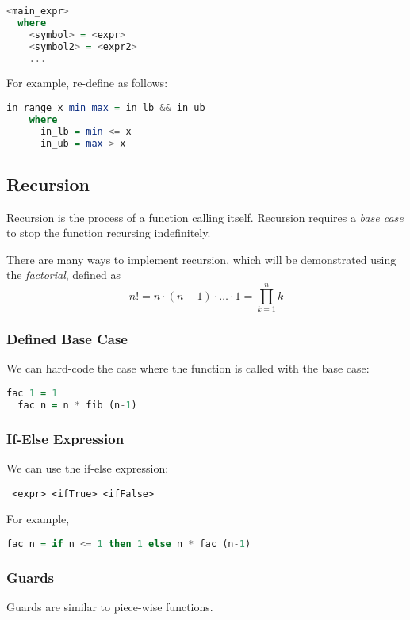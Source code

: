 \begin{lstlisting}[language=haskell]
  <main_expr>
  where
    <symbol> = <expr>
    <symbol2> = <expr2>
    ...
\end{lstlisting}

For example, re-define \texttt{} as follows:

\begin{lstlisting}[language=haskell]
  in_range x min max = in_lb && in_ub
    where
      in_lb = min <= x
      in_ub = max > x
\end{lstlisting}

\subsection{Recursion}
Recursion is the process of a function calling itself. Recursion requires a \textit{base case} to stop the function recursing indefinitely.

There are many ways to implement recursion, which will be demonstrated using the \textit{factorial}, defined as
\[n! = n \cdot (n - 1) \cdot \ldots \cdot 1 = \prod_{k = 1}^{n} k\]

\subsubsection{Defined Base Case}
We can hard-code the case where the function is called with the base case:

\begin{lstlisting}[language=haskell]
  fac 1 = 1
  fac n = n * fib (n-1) 
\end{lstlisting}

\subsubsection{If-Else Expression}
We can use the if-else expression:

\begin{center}
  \texttt{ <expr>  <ifTrue>  <ifFalse>}
\end{center}

For example,

\begin{lstlisting}[language=haskell]
  fac n = if n <= 1 then 1 else n * fac (n-1)
\end{lstlisting}

\subsubsection{Guards}
Guards are similar to piece-wise functions.

